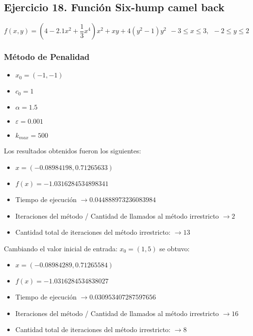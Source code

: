 \documentclass[titlepage, 11pt]{scrartcl}
\begin{document}
	\subsection{Ejercicio 18. Función Six-hump camel back}
	\begin{equation*}
		f(x, y) = (4 - 2.1x^2 + \frac{1}{3}x^4)x^2 + xy + 4(y^2 - 1)y^2 \ \ -3 \leq x \leq 3, \ \ -2 \leq y \leq 2
	\end{equation*}
	\subsubsection{Método de Penalidad}
	\begin{itemize}
		\item $x_0 = (-1, -1)$
		\item $c_0 = 1$
		\item $\alpha = 1.5$
		\item $\varepsilon = 0.001$
		\item $k_{max} = 500$
	\end{itemize}
	Los resultados obtenidos fueron los siguientes:
	\begin{itemize}
		\item $x = (-0.08984198,  0.71265633)$
		\item $f(x) = -1.0316284534898341$
		\item Tiempo de ejecución $\rightarrow 0.044888973236083984$
		\item Iteraciones del método / Cantidad de llamados al método irrestricto $\rightarrow 2$
		\item Cantidad total de iteraciones del método irrestricto: $\rightarrow 13$
	\end{itemize}
	Cambiando el valor inicial de entrada: $x_0 = (1, 5)$ se obtuvo:
	\begin{itemize}
		\item $x = (-0.08984289,  0.71265584)$
		\item $f(x) = -1.0316284534838027$
		\item Tiempo de ejecución $\rightarrow  0.030953407287597656$
		\item Iteraciones del método / Cantidad de llamados al método irrestricto $\rightarrow 16$
		\item Cantidad total de iteraciones del método irrestricto: $\rightarrow 8$
	\end{itemize}
	
\end{document}
